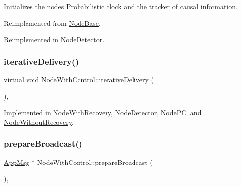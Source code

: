 Initializes the nodes Probabilistic clock and the tracker of causal information. 



Reimplemented from \hyperlink{class_node_base_af7910c39553111295b66c88742d1198a}{Node\+Base}.



Reimplemented in \hyperlink{class_node_detector_aefa188ab0657837b1b57f24674d3ef22}{Node\+Detector}.

\mbox{\label{class_node_with_control_a4f78078272b90937e0746c797443b37d}} 
\subsubsection{\texorpdfstring{iterative\+Delivery()}{iterativeDelivery()}}
{\footnotesize\ttfamily virtual void Node\+With\+Control\+::iterative\+Delivery (\begin{DoxyParamCaption}{ }\end{DoxyParamCaption})\hspace{0.3cm}{\ttfamily [protected]}, {}}



Implemented in \hyperlink{class_node_with_recovery_a9b61912f38b62452584dc80bf261ef4e}{Node\+With\+Recovery}, \hyperlink{class_node_detector_a17ecf9939fce7471f4513b66185743cc}{Node\+Detector}, \hyperlink{class_node_p_c_a7ac363db597ebadd3b18dd4343440aa1}{Node\+PC}, and \hyperlink{class_node_without_recovery_a65e21db6d6b4e72b898fd567f8b4aee2}{Node\+Without\+Recovery}.

\mbox{\label{class_node_with_control_ab871014cf3f42d834f8d34ad5498174c}} 
\subsubsection{\texorpdfstring{prepare\+Broadcast()}{prepareBroadcast()}}
{\footnotesize\ttfamily \hyperlink{class_app_msg}{App\+Msg} $\ast$ Node\+With\+Control\+::prepare\+Broadcast (\begin{DoxyParamCaption}{ }\end{DoxyParamCaption})\hspace{0.3cm}{\ttfamily [protected]}, {\ttfamily [virtual]}}



